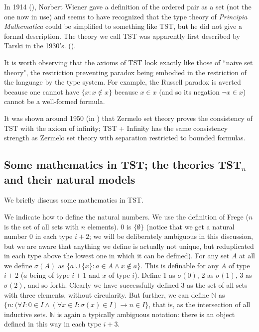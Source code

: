 \documentclass[112pt]{article}
\begin{document}
In 1914 (\cite{wiener}), Norbert Wiener gave a definition of the ordered pair as a set (not the one now in use) and seems to have recognized that the type theory of {\em Principia Mathematica\/} could be simplified to something like TST, but he did not give a formal description.  The theory we call TST was apparently first described by Tarski in the 1930's.  (\cite{tarskiontst}).

It is worth observing that the axioms of TST look exactly like those of ``naive set theory", the restriction preventing paradox being embodied in the restriction of the language by the type system.
For example, the Russell paradox is averted because one cannot have $\{x:x \not\in x\}$ because $x \in x$ (and so its negation $\neg x \in x$) cannot be a well-formed formula.

It was shown around 1950 (in \cite{kemeny}) that Zermelo set theory proves the consistency of TST with the axiom of infinity;  TST + Infinity has the same consistency strength as
Zermelo set theory with separation restricted to bounded formulas.




\newpage

\subsection{Some mathematics in TST;  the theories TST$_n$ and their natural models}

We briefly discuss some mathematics in TST.

We indicate how to define the natural numbers.  We use the definition of Frege ($n$ is the set of all sets with $n$ elements).  0 is $\{\emptyset\}$ (notice that we get a natural number 0 in each type $i+2$;  we will be deliberately ambiguous in this discussion, but we are aware that anything we define is actually not unique, but reduplicated in each type above the lowest one in which it can be defined).  For any set $A$ at all we define $\sigma(A)$ as $\{a \cup \{x\}:a \in A \wedge x \not\in a\}$.  This is definable for any $A$ of type $i+2$ ($a$ being of type $i+1$ and $x$ of type $i$).  Define 1 as $\sigma(0)$, 2 as $\sigma(1)$,  3 as $\sigma(2)$, and so forth.  Clearly we have successfully defined 3 as the set of all sets with three elements, without circularity.
But further, we can define $\mathbb N$ as $\{n:(\forall I:0 \in I \wedge (\forall x \in I:\sigma(x) \in I) \rightarrow n \in I\}$, that is, as the intersection of all inductive sets.
$\mathbb N$ is again a typically ambiguous notation:  there is an object defined in this way in each type $i+3$.
\end{document}
